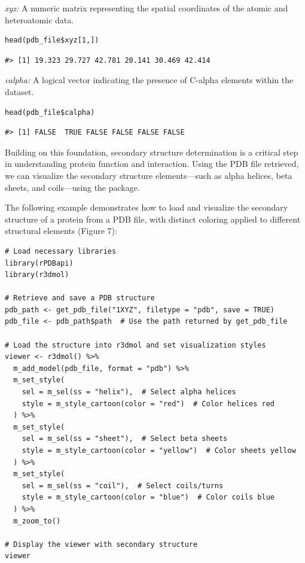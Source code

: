 \emph{xyz:} A numeric matrix representing the spatial coordinates of the atomic and heteroatomic data.

\begin{verbatim}
head(pdb_file$xyz[1,])
\end{verbatim}

\begin{verbatim}
#> [1] 19.323 29.727 42.781 20.141 30.469 42.414
\end{verbatim}

\emph{calpha:} A logical vector indicating the presence of C-alpha elements within the dataset.

\begin{verbatim}
head(pdb_file$calpha)
\end{verbatim}

\begin{verbatim}
#> [1] FALSE  TRUE FALSE FALSE FALSE FALSE
\end{verbatim}

Building on this foundation, secondary structure determination is a critical step in understanding protein function and interaction. Using the PDB file retrieved, we can visualize the secondary structure elements---such as alpha helices, beta sheets, and coils---using the  package.

The following example demonstrates how to load and visualize the secondary structure of a protein from a PDB file, with distinct coloring applied to different structural elements (Figure 7):

\begin{verbatim}
# Load necessary libraries
library(rPDBapi)
library(r3dmol)

# Retrieve and save a PDB structure
pdb_path <- get_pdb_file("1XYZ", filetype = "pdb", save = TRUE)
pdb_file <- pdb_path$path  # Use the path returned by get_pdb_file

# Load the structure into r3dmol and set visualization styles
viewer <- r3dmol() %>%
  m_add_model(pdb_file, format = "pdb") %>%
  m_set_style(
    sel = m_sel(ss = "helix"),  # Select alpha helices
    style = m_style_cartoon(color = "red")  # Color helices red
  ) %>%
  m_set_style(
    sel = m_sel(ss = "sheet"),  # Select beta sheets
    style = m_style_cartoon(color = "yellow")  # Color sheets yellow
  ) %>%
  m_set_style(
    sel = m_sel(ss = "coil"),  # Select coils/turns
    style = m_style_cartoon(color = "blue")  # Color coils blue
  ) %>%
  m_zoom_to()

# Display the viewer with secondary structure
viewer
\end{verbatim}

